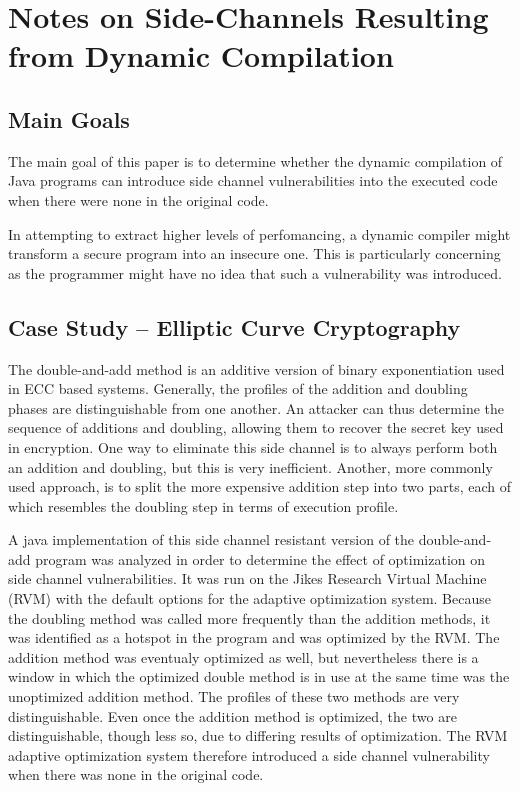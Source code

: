 
\section{Notes on Side-Channels Resulting \\ from Dynamic Compilation}

\subsection{Main Goals}

The main goal of this paper is to determine whether the dynamic compilation of Java programs can
introduce side channel vulnerabilities into the executed code when there were
none in the original code. 

In attempting to extract higher levels of perfomancing, a dynamic compiler
might transform a secure program into an insecure one. This is particularly
concerning as the programmer might have no idea that such a vulnerability was
introduced. 

\subsection{Case Study -- Elliptic Curve Cryptography}

The double-and-add method is an additive version of binary exponentiation used
in ECC based systems. Generally, the profiles of the addition and doubling
phases are distinguishable from one another. An attacker can thus determine the
sequence of additions and doubling, allowing them to recover the
secret key used in encryption. One way to eliminate this side channel is to
always perform both an addition and doubling, but this is very inefficient.
Another, more commonly used approach, is to split the more expensive addition
step into two parts, each of which resembles the doubling step in terms of
execution profile. 

A java implementation of this side channel resistant version of the
double-and-add program was analyzed in order to determine the effect of
optimization on side channel vulnerabilities. It was run on the Jikes Research
Virtual Machine (RVM) with the default options for the adaptive optimization
system.
Because the doubling method was called more frequently than the addition
methods, it was identified as a hotspot in the program and was optimized by the
RVM. The addition method was eventualy optimized as well, but nevertheless
there is a window in which the optimized double method is in use at the same
time was the unoptimized addition method. The profiles of these two methods are
very distinguishable. Even once the addition method is optimized, the two are
distinguishable, though less so, due to differing results of optimization.
The RVM adaptive optimization system therefore introduced a side channel
vulnerability when there was none in the original code. 


